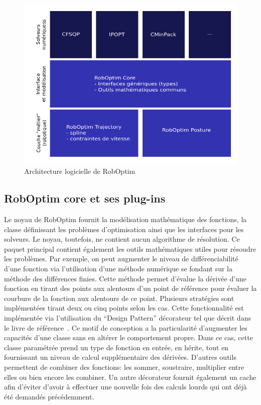 \begin{figure}
  \begin{center}
    \includegraphics{src/chap1-roboptim/roboptim-architecture.pdf}
  \end{center}
  \caption{Architecture logicielle de RobOptim}
\end{figure}

\subsection{RobOptim core et ses plug-ins}
\label{sec:chap1_roboptim_plugin}

Le noyau de RobOptim fournit la modélisation mathématique des
fonctions, la classe définissant les problèmes d'optimisation ainsi
que les interfaces pour les solveurs. Le noyau, toutefois, ne contient
aucun algorithme de résolution. Ce paquet principal contient également
les outils mathématiques utiles pour résoudre les problèmes. Par
exemple, on peut augmenter le niveau de différenciabilité d'une
fonction via l'utilisation d'une méthode numérique se fondant sur la
méthode des différences finies. Cette méthode permet d'évalue la
dérivée d'une fonction en tirant des points aux alentours d'un point
de référence pour évaluer la courbure de la fonction aux alentours de
ce point. Plusieurs stratégies sont implémentées tirant deux ou cinq
points selon les cas. Cette fonctionnalité est implémentée via
l'utilisation du ``Design Pattern'' décorateur tel que décrit dans le livre de
référence \citep{94gamma}. Ce motif de conception a la
particularité d'augmenter les capacités d'une classe sans en altérer
le comportement propre. Dans ce cas, cette classe paramétrée prend un
type de fonction en entrée, en hérite, tout en fournissant un niveau
de calcul supplémentaire des dérivées. D'autres outils permettent de
combiner des fonctions: les sommer, soustraire, multiplier entre elles
ou bien encore les combiner. Un autre décorateur fournit également un
cache afin d'éviter d'avoir à effectuer une nouvelle fois des calculs
lourds qui ont déjà été demandés précédemment.

